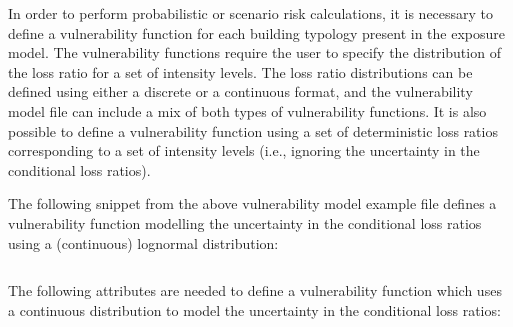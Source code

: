 \inputminted[firstline=4,firstnumber=4,lastline=8,fontsize=\footnotesize,frame=single,linenos,bgcolor=lightgray]{xml}{oqum/risk/Verbatim/input_vulnerability.xml}


In order to perform probabilistic or scenario risk calculations, it is
necessary to define a \gls{vulnerability function} for each building typology
present in the exposure model. The \glspl{vulnerability function} require the
user to specify the distribution of the loss ratio for a set of intensity
levels. The loss ratio distributions can be defined using either a discrete or
a continuous format, and the \gls{vulnerability model} file can include a mix
of both types of \glspl{vulnerability function}. It is also possible to define
a vulnerability function using a set of deterministic loss ratios
corresponding to a set of intensity levels (i.e., ignoring the uncertainty in
the conditional loss ratios).

The following snippet from the above \gls{vulnerability model} example file defines
a \gls{vulnerability function} modelling the uncertainty in the conditional loss
ratios using a (continuous) lognormal distribution:

\inputminted[firstline=10,firstnumber=10,lastline=14,fontsize=\footnotesize,frame=single,linenos,bgcolor=lightgray]{xml}{oqum/risk/Verbatim/input_vulnerability.xml}

The following attributes are needed to define a \gls{vulnerability function} which
uses a continuous distribution to model the uncertainty in the conditional
loss ratios:

